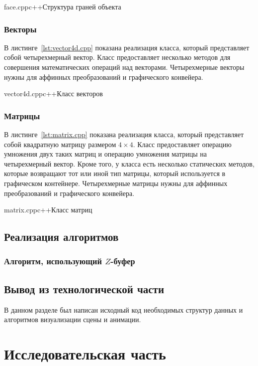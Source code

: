 {face.cpp}{c++}{Структура граней объекта}

\subsection{Векторы}

В листинге~\ref{lst:vector4d.cpp} показана реализация класса, который представляет собой четырехмерный вектор. 
Класс предоставляет несколько методов для совершения математических операций над векторами. 
Четырехмерные векторы нужны для аффинных преобразований и графического конвейера.

{vector4d.cpp}{c++}{Класс векторов}

\subsection{Матрицы}

В листинге~\ref{lst:matrix.cpp} показана реализация класса, который представляет собой квадратную матрицу размером $4 \times 4$. 
Класс предоставляет операцию умножения двух таких матриц и операцию умножения матрицы на четырехмерный вектор. 
Кроме того, у класса есть несколько статических методов, которые возвращают тот или иной тип матрицы, который используется в графическом контейнере. 
Четырехмерные матрицы нужны для аффинных преобразований и графического конвейера.

{matrix.cpp}{c++}{Класс матриц}

\section{Реализация алгоритмов}

\subsection{Алгоритм, использующий $Z$-буфер}

\section*{Вывод из технологической части}

В данном разделе был написан исходный код необходимых структур данных и алгоритмов визуализации сцены и анимации. 

\chapter{Исследовательская часть}

